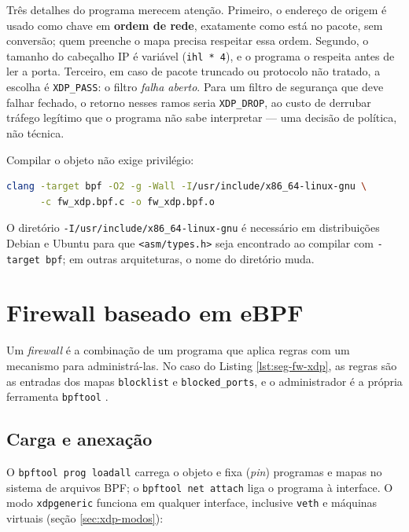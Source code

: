 Três detalhes do programa merecem atenção. Primeiro, o endereço de origem é usado
como chave em \textbf{ordem de rede}, exatamente como está no pacote, sem conversão;
quem preenche o mapa precisa respeitar essa ordem. Segundo, o tamanho do cabeçalho IP
é variável (\texttt{ihl * 4}), e o programa o respeita antes de ler a porta. Terceiro,
em caso de pacote truncado ou protocolo não tratado, a escolha é \texttt{XDP\_PASS}:
o filtro \textit{falha aberto}. Para um filtro de segurança que deve falhar fechado,
o retorno nesses ramos seria \texttt{XDP\_DROP}, ao custo de derrubar tráfego
legítimo que o programa não sabe interpretar --- uma decisão de política, não técnica.

Compilar o objeto não exige privilégio:

\begin{lstlisting}[language=bash, caption={Compilação do programa XDP.}, label=lst:seg-compila]
clang -target bpf -O2 -g -Wall -I/usr/include/x86_64-linux-gnu \
      -c fw_xdp.bpf.c -o fw_xdp.bpf.o
\end{lstlisting}

O diretório \texttt{-I/usr/include/x86\_64-linux-gnu} é necessário em distribuições
Debian e Ubuntu para que \texttt{<asm/types.h>} seja encontrado ao compilar com
\texttt{-target bpf}; em outras arquiteturas, o nome do diretório muda.

\section{Firewall baseado em eBPF}

Um \textit{firewall} é a combinação de um programa que aplica regras com um mecanismo
para administrá-las. No caso do Listing \ref{lst:seg-fw-xdp}, as regras são as
entradas dos mapas \texttt{blocklist} e \texttt{blocked\_ports}, e o administrador é a
própria ferramenta \texttt{bpftool} \cite{linuxkernel2024}.

\subsection*{Carga e anexação}

O \texttt{bpftool prog loadall} carrega o objeto e fixa (\textit{pin}) programas e
mapas no sistema de arquivos BPF; o \texttt{bpftool net attach} liga o programa à
interface. O modo \texttt{xdpgeneric} funciona em qualquer interface, inclusive
\texttt{veth} e máquinas virtuais (seção \ref{sec:xdp-modos}):

